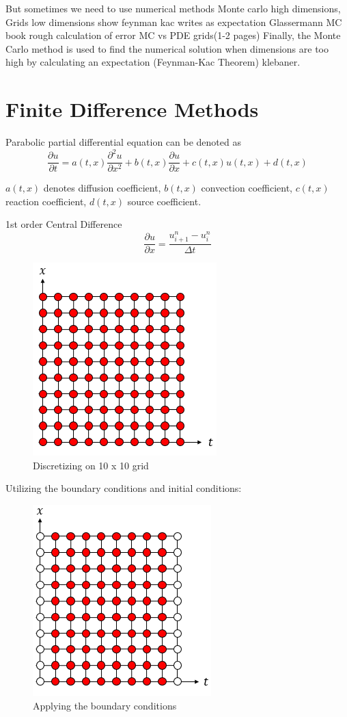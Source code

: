 \documentclass[12pt, oneside]{book}
\theoremstyle{plain}
\theoremstyle{definition}
\begin{document}
But sometimes we need to use numerical methods Monte carlo high dimensions, Grids low dimensions show feynman kac writes as expectation
Glassermann MC book rough calculation of error MC vs PDE grids(1-2 pages)
Finally, the Monte Carlo method is used to find the numerical solution when dimensions are too high by calculating an expectation (Feynman-Kac Theorem) klebaner.

\section{Finite Difference Methods}
Parabolic partial differential equation can be denoted as
$$ \frac{\partial u}{\partial t} = a(t,x) \frac{\partial^2 u}{\partial x^2} + b(t,x) \frac{\partial u}{\partial x} + c(t,x) u(t,x) + d(t,x) $$

$a(t,x)$ denotes diffusion coefficient,  $b(t,x)$ convection coefficient, $c(t,x)$ reaction coefficient, $d(t,x)$ source coefficient.

1st order Central Difference 
$$ \frac{\partial u}{\partial x} = \frac{u^{n}_{i+1} - u^n_i}{\Delta t} $$

    \begin{figure}[!htb]
        \centering
            \includegraphics[scale=0.9]{Discretize.png}
        \caption{Discretizing on 10 x 10 grid}
    \end{figure}
    
Utilizing the boundary conditions and initial conditions:
    \begin{figure}[!htb]
        \centering
            \includegraphics[scale=0.9]{Boundary.png}
        \caption{Applying the boundary conditions}
    \end{figure}
\end{document}
